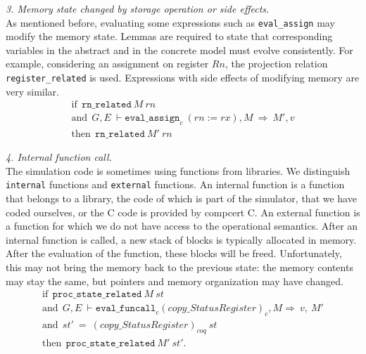 \documentclass{llncs}
\begin{document}
\medskip\noindent
  \textit{3. Memory state changed by storage operation or side effects.}\\ %
  As mentioned before, evaluating some expressions such as
  \texttt{eval\_assign} may modify the memory state.  Lemmas are
  required to state that corresponding variables in the abstract and
  in the concrete model must evolve consistently.  For example,
  considering an assignment on register $Rn$, the projection relation
  \texttt{register\_related} is used. Expressions with side effects of
  modifying memory are very similar.
\[
\begin{array}{l}
\textrm{if} ~~ \texttt{rn\_related}~M~rn\\
\textrm{and}~~  G,E~\vdash \texttt{eval\_assign}_c~(rn:=rx),M~\Rightarrow~ M',v\\
\textrm{then} ~~ \texttt{rn\_related}~M'~rn
\end{array}
\]

\medskip\noindent
  \textit{4. Internal function call.}\\
  The simulation code is sometimes using functions from libraries.
  We   distinguish \texttt{internal} functions and \texttt{external}
  functions.  An internal function is a function that belongs to a
  library, the code of which is part of the simulator, that we have
  coded ourselves, or the C code is provided by compcert C.  An
  external function is a function for which we do not have access to
  the operational semantics.  After an internal function is called, a
  new stack of blocks is typically allocated in memory.  After the
  evaluation of the function, these blocks will be freed.
  Unfortunately, this may not bring the memory back to the previous
  state: the memory contents may stay the same, but pointers and
  memory organization may have changed.
  \label{page:libfunast}
  \[
  \begin{array}{l}
    \textrm{if} ~~  \texttt{proc\_state\_related}~M~st \\
    \textrm{and} ~~ G,E~\vdash \texttt{eval\_funcall}_c (copy\_StatusRegister)_c,M\Rightarrow~v,~M'\\
    \textrm{and} ~~ st'~=~(copy\_StatusRegister)_{coq}~st\\
    \textrm{then} ~~\texttt{proc\_state\_related}~M'~st'.
  \end{array}
  \]
\end{document}
